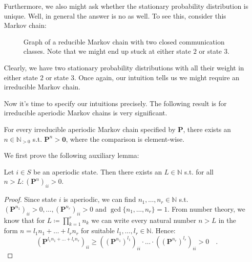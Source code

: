 \documentclass[../../main.tex]{subfiles}
\begin{document}
Furthermore, we also might ask whether the stationary probability distribution is unique. Well, in general the answer is no as well. To see this, consider this Markov chain:

\begin{figure}[h]
    \center
    \caption{Graph of a reducible Markov chain with two closed communication classes. Note that we might end up stuck at either state $2$ or state $3$.}
    \label{fig:markov_chain_periodic}
\end{figure}

Clearly, we have two stationary probability distributions with all their weight in either state $2$ or state $3$. Once again, our intuition tells us we might require an irreducible Markov chain.

Now it's time to specify our intuitions precisely. The following result is for irreducible aperiodic Markov chains is very significant.

\begin{theorem}
    For every irreducible aperiodic Markov chain specified by $\bm{P}$, there exists an $n \in \mathbb{N}_{>0}$ s.t. $\bm{P}^n > \bm{0}$, where the comparison is element-wise.
    \label{theorem:positive_transition_matrix}
\end{theorem}

We first prove the following auxiliary lemma:

\begin{lemma}
    Let $i \in S$ be an aperiodic state. Then there exists an $L \in \mathbb{N}$ s.t. for all $n > L: (\bm{P}^n)_{ii} > 0$.
    \label{lemma:aux}
\end{lemma}
\begin{proof}
    Since state $i$ is aperiodic, we can find $n_1, \dots, n_r \in \mathbb{N}$ s.t. $(\bm{P}^{n_1})_{ii} > 0, \dots, (\bm{P}^{n_r})_{ii} > 0$ and $\gcd \{ n_1, \dots , n_r \} = 1$. From number theory, we know that for $L \coloneqq \prod_{k=1}^{r} n_k$ we can write every natural number $n > L$ in the form $n = l_1 n_1 + \dots + l_r n_r$ for suitable $l_1, \dots, l_r \in \mathbb{N}$. Hence:
    \[
        (\bm{P}^{l_1 n_1 + \dots + l_r n_r})_{ii} \geq ((\bm{P}^{n_1})^{l_1})_{ii} \cdot \dots \cdot ((\bm{P}^{n_r})^{l_r})_{ii} > 0 \quad .
    \]
\end{proof}
\end{document}
